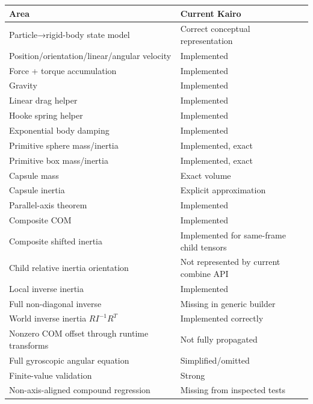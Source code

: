 {\def\LTcaptype{none} %
\begin{longtable}[]{@{}
  >{\raggedright\arraybackslash}p{}
  >{\raggedright\arraybackslash}p{}@{}}
\toprule\noalign{}
\begin{minipage}[b]{\linewidth}\raggedright
Area
\end{minipage} & \begin{minipage}[b]{\linewidth}\raggedright
Current Kairo
\end{minipage} \\
\midrule\noalign{}
\endhead
\bottomrule\noalign{}
\endlastfoot
Particle→rigid-body state model & Correct conceptual representation \\
Position/orientation/linear/angular velocity & Implemented \\
Force + torque accumulation & Implemented \\
Gravity & Implemented \\
Linear drag helper & Implemented \\
Hooke spring helper & Implemented \\
Exponential body damping & Implemented \\
Primitive sphere mass/inertia & Implemented, exact \\
Primitive box mass/inertia & Implemented, exact \\
Capsule mass & Exact volume \\
Capsule inertia & Explicit approximation \\
Parallel-axis theorem & Implemented \\
Composite COM & Implemented \\
Composite shifted inertia & Implemented for same-frame child tensors \\
Child relative inertia orientation & Not represented by current combine API \\
Local inverse inertia & Implemented \\
Full non-diagonal inverse & Missing in generic builder \\
World inverse inertia \(RI^{-1}R^T\) & Implemented correctly \\
Nonzero COM offset through runtime transforms & Not fully propagated \\
Full gyroscopic angular equation & Simplified/omitted \\
Finite-value validation & Strong \\
Non-axis-aligned compound regression & Missing from inspected tests \\
\end{longtable}
}

